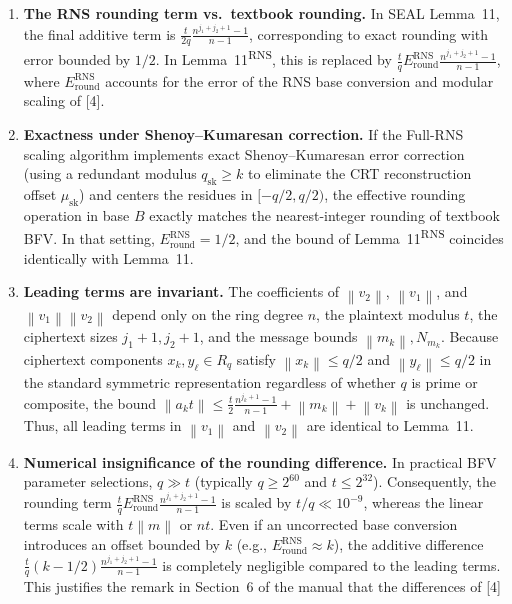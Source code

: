 \documentclass[11pt]{article}
\newcommand{\norm}[1]{\left\lVert #1\right\rVert}
\newcommand{\musk}{\mu_{\mathrm{sk}}}
\newcommand{\Sgeo}[1]{\frac{n^{#1+1}-1}{n-1}}            %
\theoremstyle{plain}
\theoremstyle{definition}
\theoremstyle{remark}
\begin{document}
\begin{enumerate}[leftmargin=2em]
\item \textbf{The RNS rounding term vs.\ textbook rounding.}
      In SEAL Lemma~11, the final additive term is
      $\frac{t}{2q}\Sgeo{j_1+j_2}$, corresponding to exact rounding with error bounded by $1/2$.
      In Lemma~11\textsuperscript{RNS}, this is replaced by
      $\frac{t}{q}E_{\mathrm{round}}^{\mathrm{RNS}}\Sgeo{j_1+j_2}$, where $E_{\mathrm{round}}^{\mathrm{RNS}}$
      accounts for the error of the RNS base conversion and modular scaling of [4].
\item \textbf{Exactness under Shenoy--Kumaresan correction.}
      If the Full-RNS scaling algorithm implements exact Shenoy--Kumaresan error correction
      (using a redundant modulus $q_{\mathrm{sk}}\geq k$ to eliminate the CRT reconstruction offset $\musk$)
      and centers the residues in $[-q/2, q/2)$, the effective rounding operation in base $B$ exactly matches
      the nearest-integer rounding of textbook BFV. In that setting, $E_{\mathrm{round}}^{\mathrm{RNS}} = 1/2$,
      and the bound of Lemma~11\textsuperscript{RNS} coincides identically with Lemma~11.
\item \textbf{Leading terms are invariant.}
      The coefficients of $\norm{v_2}$, $\norm{v_1}$, and $\norm{v_1}\norm{v_2}$ depend only on the ring
      degree $n$, the plaintext modulus $t$, the ciphertext sizes $j_1+1, j_2+1$, and the message bounds
      $\norm{m_k}, N_{m_k}$. Because ciphertext components $x_k, y_\ell\in R_q$ satisfy $\norm{x_k}\leq q/2$
      and $\norm{y_\ell}\leq q/2$ in the standard symmetric representation regardless of whether $q$ is prime
      or composite, the bound $\norm{a_k t}\leq \frac{t}{2}\Sgeo{j_k} + \norm{m_k} + \norm{v_k}$ is unchanged.
      Thus, all leading terms in $\norm{v_1}$ and $\norm{v_2}$ are identical to Lemma~11.
\item \textbf{Numerical insignificance of the rounding difference.}
      In practical BFV parameter selections, $q\gg t$ (typically $q \geq 2^{60}$ and $t \leq 2^{32}$).
      Consequently, the rounding term $\frac{t}{q}E_{\mathrm{round}}^{\mathrm{RNS}}\Sgeo{j_1+j_2}$ is scaled
      by $t/q \ll 10^{-9}$, whereas the linear terms scale with $t\norm{m}$ or $nt$.
      Even if an uncorrected base conversion introduces an offset bounded by $k$ (e.g., $E_{\mathrm{round}}^{\mathrm{RNS}} \approx k$),
      the additive difference $\frac{t}{q}(k - 1/2)\Sgeo{j_1+j_2}$ is completely negligible compared to the
      leading terms. This justifies the remark in Section~6 of the manual that the differences of [4]

\end{enumerate}
\end{document}
